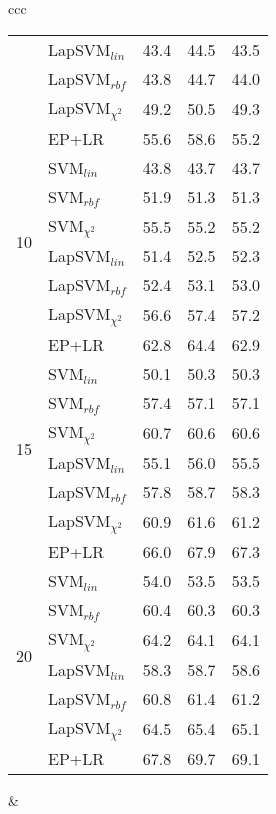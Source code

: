 \documentclass[journal,11pt]{IEEEtran}
\begin{document}
\begin{center}
{\begin{tabular}{ccc}
\begin{tabular}{|r|l|rrr|}
& LapSVM$_{lin}$ 	 	& 43.4 & 44.5 & 43.5 \\
& LapSVM$_{rbf}$ 	 	& 43.8 & 44.7 & 44.0 \\
& LapSVM$_{\chi^2}$ & 49.2 & 50.5 & 49.3 \\
& EP+LR							& 55.6 & 58.6 & 55.2 \\
\hline
\multirow{6}{*}{10}
& SVM$_{lin}$ 	 		& 43.8 & 43.7 & 43.7 \\
& SVM$_{rbf}$ 	 		& 51.9 & 51.3 & 51.3 \\
& SVM$_{\chi^2}$ 		& 55.5 & 55.2 & 55.2 \\
& LapSVM$_{lin}$ 	 	& 51.4 & 52.5 & 52.3 \\
& LapSVM$_{rbf}$ 	 	& 52.4 & 53.1 & 53.0 \\
& LapSVM$_{\chi^2}$ & 56.6 & 57.4 & 57.2 \\
& EP+LR							& 62.8 & 64.4 & 62.9 \\
\hline
\multirow{6}{*}{15}
& SVM$_{lin}$ 	 		& 50.1 & 50.3 & 50.3 \\
& SVM$_{rbf}$ 	 		& 57.4 & 57.1 & 57.1 \\
& SVM$_{\chi^2}$ 		& 60.7 & 60.6 & 60.6 \\
& LapSVM$_{lin}$ 	 	& 55.1 & 56.0 & 55.5 \\
& LapSVM$_{rbf}$ 	 	& 57.8 & 58.7 & 58.3 \\
& LapSVM$_{\chi^2}$ & 60.9 & 61.6 & 61.2 \\
& EP+LR							& 66.0 & 67.9 & 67.3 \\
\hline
\multirow{6}{*}{20}
& SVM$_{lin}$ 	 		& 54.0 & 53.5 & 53.5 \\
& SVM$_{rbf}$ 	 		& 60.4 & 60.3 & 60.3 \\
& SVM$_{\chi^2}$ 		& 64.2 & 64.1 & 64.1 \\
& LapSVM$_{lin}$ 	 	& 58.3 & 58.7 & 58.6 \\
& LapSVM$_{rbf}$ 	 	& 60.8 & 61.4 & 61.2 \\
& LapSVM$_{\chi^2}$ & 64.5 & 65.4 & 65.1 \\
& EP+LR							& 67.8 & 69.7 & 69.1 \\
\hline
\end{tabular}

&


\end{tabular}}
\end{center}
\end{document}
